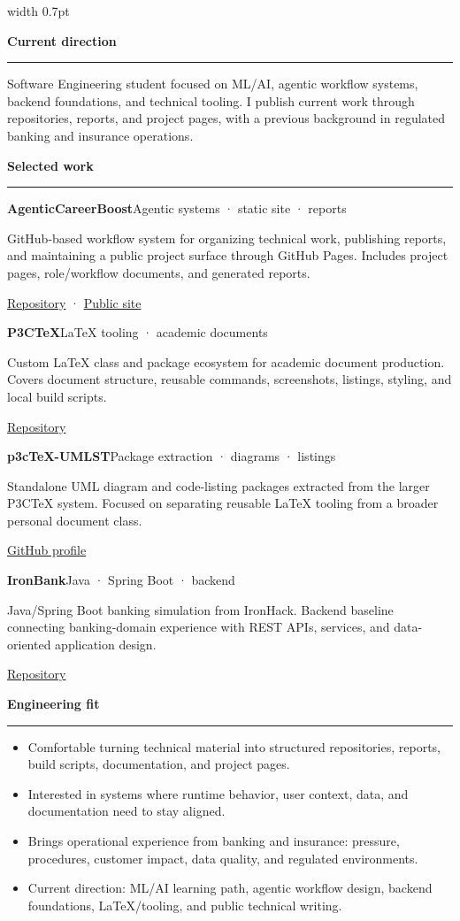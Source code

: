 \documentclass[a4paper,10pt]{article}
\newlength{\MainWidth}
\newlength{\BodyHeight}
\newcommand{\mainsection}[1]{%
	\vspace{1.30em}%
	{\hspace*{\fill}\large\bfseries\ttfamily\color{accent}#1~~}\par
	\vspace{0.3em}%
	{\color{line}\hrule}%
	\vspace{0.5em}%
}
\newcommand{\project}[4]{%
	{\bfseries #1}\hfill{\scriptsize\textcolor{muted}{#2}}\par
	#3\par
	{\scriptsize #4}\par
	\vspace{0.18em}%
}
\begin{document}
	\hfill
	{\color{line}\vrule width 0.7pt}
	\hfill
	\begin{minipage}[t][\BodyHeight]{\MainWidth}
		\small

		\mainsection{Current direction}
		Software Engineering student focused on ML/AI, agentic workflow systems, backend foundations, and technical tooling. I publish current work through repositories, reports, and project pages, with a previous background in regulated banking and insurance operations.

		\mainsection{Selected work}

		\project
		{AgenticCareerBoost}
		{Agentic systems · static site · reports}
		{GitHub-based workflow system for organizing technical work, publishing reports, and maintaining a public project surface through GitHub Pages. Includes project pages, role/workflow documents, and generated reports.}
		{\href{https://github.com/DidacLL/AgenticCareerBoost}{Repository} · \href{https://didacll.github.io/}{Public site}}

		\project
		{P3CTeX}
		{LaTeX tooling · academic documents}
		{Custom LaTeX class and package ecosystem for academic document production. Covers document structure, reusable commands, screenshots, listings, styling, and local build scripts.}
		{\href{https://github.com/DidacLL/P3CTeX}{Repository}}

		\project
		{p3cTeX-UMLST}
		{Package extraction · diagrams · listings}
		{Standalone UML diagram and code-listing packages extracted from the larger P3CTeX system. Focused on separating reusable LaTeX tooling from a broader personal document class.}
		{\href{https://github.com/DidacLL}{GitHub profile}}

		\project
		{IronBank}
		{Java · Spring Boot · backend}
		{Java/Spring Boot banking simulation from IronHack. Backend baseline connecting banking-domain experience with REST APIs, services, and data-oriented application design.}
		{\href{https://github.com/DidacLL/Ironhack-IronBank_FinalProject_vBNKsys}{Repository}}

		\mainsection{Engineering fit}
		\begin{itemize}
			\item Comfortable turning technical material into structured repositories, reports, build scripts, documentation, and project pages.
			\item Interested in systems where runtime behavior, user context, data, and documentation need to stay aligned.
			\item Brings operational experience from banking and insurance: pressure, procedures, customer impact, data quality, and regulated environments.
			\item Current direction: ML/AI learning path, agentic workflow design, backend foundations, LaTeX/tooling, and public technical writing.
		\end{itemize}


\end{minipage}
\end{document}
